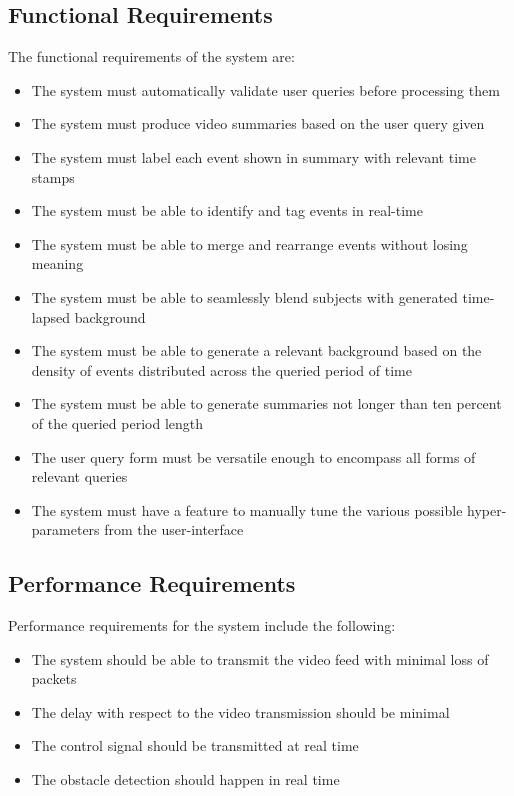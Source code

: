     \subsection{Functional Requirements}
    The functional requirements of the system are:
    \begin{itemize}
        \item The system must automatically validate user queries before processing them
        \item The system must produce video summaries based on the user query given
        \item The system must label each event shown in summary with relevant time stamps
        \item The system must be able to identify and tag events in real-time
        \item The system must be able to merge and rearrange events without losing meaning
        \item The system must be able to seamlessly blend subjects with generated time-lapsed background
        \item The system must be able to generate a relevant background based on the density of events distributed across the queried period of time
        \item The system must be able to generate summaries not longer than ten percent of the queried period length
        \item The user query form must be versatile enough to encompass all forms of relevant queries
        \item The system must have a feature to manually tune the various possible hyper-parameters from the user-interface
    \end{itemize}

    \subsection{Performance Requirements}
    Performance requirements for the system include the following:
    \begin{itemize}
        \item The system should be able to transmit the video feed with minimal loss of packets
        \item The delay with respect to the video transmission should be minimal
        \item The control signal should be transmitted at real time
        \item The obstacle detection should happen in real time
    \end{itemize}

